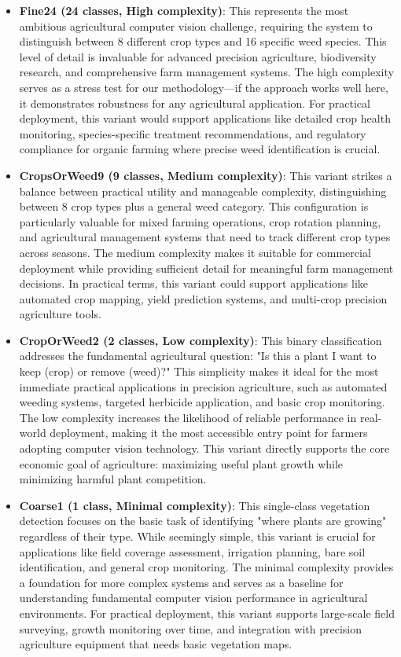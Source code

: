 \begin{itemize}
    \item \textbf{Fine24 (24 classes, High complexity)}: This represents the most ambitious agricultural computer vision challenge, requiring the system to distinguish between 8 different crop types and 16 specific weed species. This level of detail is invaluable for advanced precision agriculture, biodiversity research, and comprehensive farm management systems. The high complexity serves as a stress test for our methodology—if the approach works well here, it demonstrates robustness for any agricultural application. For practical deployment, this variant would support applications like detailed crop health monitoring, species-specific treatment recommendations, and regulatory compliance for organic farming where precise weed identification is crucial.
    
    \item \textbf{CropsOrWeed9 (9 classes, Medium complexity)}: This variant strikes a balance between practical utility and manageable complexity, distinguishing between 8 crop types plus a general weed category. This configuration is particularly valuable for mixed farming operations, crop rotation planning, and agricultural management systems that need to track different crop types across seasons. The medium complexity makes it suitable for commercial deployment while providing sufficient detail for meaningful farm management decisions. In practical terms, this variant could support applications like automated crop mapping, yield prediction systems, and multi-crop precision agriculture tools.
    
    \item \textbf{CropOrWeed2 (2 classes, Low complexity)}: This binary classification addresses the fundamental agricultural question: "Is this a plant I want to keep (crop) or remove (weed)?" This simplicity makes it ideal for the most immediate practical applications in precision agriculture, such as automated weeding systems, targeted herbicide application, and basic crop monitoring. The low complexity increases the likelihood of reliable performance in real-world deployment, making it the most accessible entry point for farmers adopting computer vision technology. This variant directly supports the core economic goal of agriculture: maximizing useful plant growth while minimizing harmful plant competition.
    
    \item \textbf{Coarse1 (1 class, Minimal complexity)}: This single-class vegetation detection focuses on the basic task of identifying "where plants are growing" regardless of their type. While seemingly simple, this variant is crucial for applications like field coverage assessment, irrigation planning, bare soil identification, and general crop monitoring. The minimal complexity provides a foundation for more complex systems and serves as a baseline for understanding fundamental computer vision performance in agricultural environments. For practical deployment, this variant supports large-scale field surveying, growth monitoring over time, and integration with precision agriculture equipment that needs basic vegetation maps.
\end{itemize}

